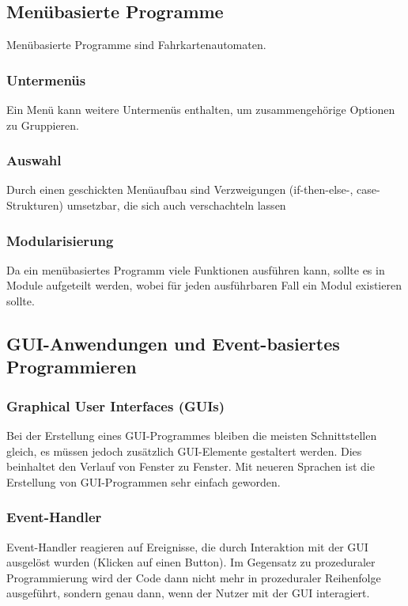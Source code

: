 		\subsection{Menübasierte Programme}
			Menübasierte Programme sind \zB Fahrkartenautomaten.

			\subsubsection{Untermenüs}
				Ein Menü kann weitere Untermenüs enthalten, um zusammengehörige Optionen zu Gruppieren.
			
			\subsubsection{Auswahl}
				Durch einen geschickten Menüaufbau sind Verzweigungen (if-then-else-, case-Strukturen) umsetzbar, die sich auch verschachteln lassen

			\subsubsection{Modularisierung}
				Da ein menübasiertes Programm viele Funktionen ausführen kann, sollte es in Module aufgeteilt werden, wobei für jeden ausführbaren Fall ein Modul existieren sollte.

		\subsection{GUI-Anwendungen und Event-basiertes Programmieren}
			\subsubsection{Graphical User Interfaces (GUIs)}
				Bei der Erstellung eines GUI-Programmes bleiben die meisten Schnittstellen gleich, es müssen jedoch zusätzlich GUI-Elemente gestaltert werden. Dies beinhaltet den Verlauf von Fenster zu Fenster. Mit neueren Sprachen ist die Erstellung von GUI-Programmen sehr einfach geworden.

			\subsubsection{Event-Handler}
				Event-Handler reagieren auf Ereignisse, die durch Interaktion mit der GUI ausgelöst wurden (\zB Klicken auf einen Button). Im Gegensatz zu prozeduraler Programmierung wird der Code dann nicht mehr in prozeduraler Reihenfolge ausgeführt, sondern genau dann, wenn der Nutzer mit der GUI interagiert.

